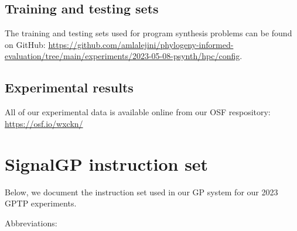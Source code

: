 \documentclass[
]{book}
\begin{document}
\hypertarget{training-and-testing-sets}{%
\section{Training and testing sets}\label{training-and-testing-sets}}

The training and testing sets used for program synthesis problems can be found on GitHub: \url{https://github.com/amlalejini/phylogeny-informed-evaluation/tree/main/experiments/2023-05-08-psynth/hpc/config}.

\hypertarget{experimental-results}{%
\section{Experimental results}\label{experimental-results}}

All of our experimental data is available online from our OSF respository: \url{https://osf.io/wxckn/}

\hypertarget{signalgp-instruction-set}{%
\chapter{SignalGP instruction set}\label{signalgp-instruction-set}}

Below, we document the instruction set used in our GP system for our 2023 GPTP experiments.

Abbreviations:
\end{document}

